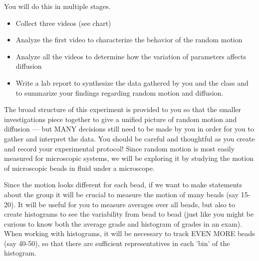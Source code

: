 You will do this in multiple stages.
\begin{itemize}
\item Collect three videos (see chart)
\item Analyze the first video to characterize the behavior of the random motion
\item Analyze all the videos to determine how the variation of parameters affects diffusion
\item Write a lab report to synthesize the data gathered by you and the class and to
summarize your findings regarding random motion and diffusion.
\end{itemize}
\par 
The broad structure of this experiment is provided to you so that the smaller investigations piece together to give a unified picture of random motion and diffusion — but MANY decisions still need to be made by you in order for you to gather and interpret the data.
You should be careful and thoughtful as you create and record your experimental protocol!
Since random motion is most easily measured for microscopic systems, we will be exploring it by studying the motion of microscopic beads in fluid under a microscope.
\par
Since the motion looks different for each bead, if we want to make statements about the group it will be crucial to measure the motion of many beads (say 15-20).
It will be useful for you to measure averages over all beads, but also to create histograms to see the variability from bead to bead (just like you might be curious to know both the average grade and histogram of grades in an exam).
When working with histograms, it will be necessary to track EVEN MORE beads (say 40-50), so that there are sufficient representatives in each 'bin' of the histogram.
